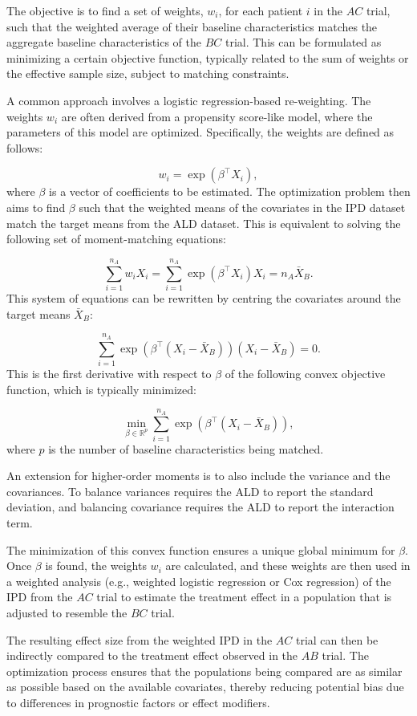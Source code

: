 \documentclass[article]{jss}
\begin{document}
The objective is to find a set of weights, $w_i$, for each patient $i$ in the $AC$ trial, such that the weighted average of their baseline characteristics matches the aggregate baseline characteristics of the $BC$ trial. This can be formulated as minimizing a certain objective function, typically related to the sum of weights or the effective sample size, subject to matching constraints.

A common approach involves a logistic regression-based re-weighting. The weights $w_i$ are often derived from a propensity score-like model, where the parameters of this model are optimized. Specifically, the weights are defined as follows:

$$ 
w_i = \exp(\beta^\top X_i),
$$
where $\beta$ is a vector of coefficients to be estimated. The optimization problem then aims to find $\beta$ such that the weighted means of the covariates in the IPD dataset match the target means from the ALD dataset. This is equivalent to solving the following set of moment-matching equations:

$$ 
\sum_{i=1}^{n_A} w_i X_i = \sum_{i=1}^{n_A} \exp(\beta^\top X_i) X_i = n_A \bar{X}_B.
$$
This system of equations can be rewritten by centring the covariates around the target means $\bar{X}_B$:

$$ 
\sum_{i=1}^{n_A} \exp(\beta^\top (X_i - \bar{X}_B)) (X_i - \bar{X}_B) = 0. 
$$
This is the first derivative with respect to $\beta$ of the following convex objective function, which is typically minimized:

$$
\min_{\beta \in \mathbb{R}^p} \sum_{i=1}^{n_A} \exp(\beta^\top (X_i - \bar{X}_B)),
$$
where $p$ is the number of baseline characteristics being matched. 

An extension for higher-order moments is to also include the variance and the covariances. To balance variances requires the ALD to report the standard deviation, and balancing covariance requires the ALD to report the interaction term.

The minimization of this convex function ensures a unique global minimum for $\beta$. Once $\beta$ is found, the weights $w_i$ are calculated, and these weights are then used in a weighted analysis (e.g., weighted logistic regression or Cox regression) of the IPD from the $AC$ trial to estimate the treatment effect in a population that is adjusted to resemble the $BC$ trial.

The resulting effect size from the weighted IPD in the $AC$ trial can then be indirectly compared to the treatment effect observed in the $AB$ trial. The optimization process ensures that the populations being compared are as similar as possible based on the available covariates, thereby reducing potential bias due to differences in prognostic factors or effect modifiers.
\end{document}
